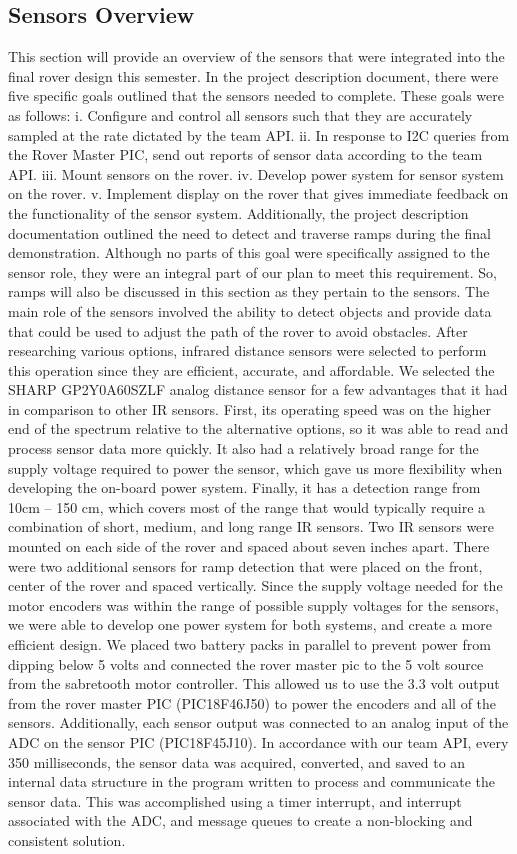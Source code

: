 \subsection{Sensors Overview}
This section will provide an overview of the sensors that were integrated into the final rover design this semester. In the project description document, there were five specific goals outlined that the sensors needed to complete. These goals were as follows: 
i. Configure and control all sensors such that they are accurately sampled at the rate dictated by the team API.
ii. In response to I2C queries from the Rover Master PIC, send out reports of sensor data according to the team API.
iii. Mount sensors on the rover.
iv. Develop power system for sensor system on the rover.
v. Implement display on the rover that gives immediate feedback on the functionality of the sensor system.
Additionally, the project description documentation outlined the need to detect and traverse ramps during the final demonstration. Although no parts of this goal were specifically assigned to the sensor role, they were an integral part of our plan to meet this requirement. So, ramps will also be discussed in this section as they pertain to the sensors.
The main role of the sensors involved the ability to detect objects and provide data that could be used to adjust the path of the rover to avoid obstacles. After researching various options, infrared distance sensors were selected to perform this operation since they are efficient, accurate, and affordable. We selected the SHARP GP2Y0A60SZLF analog distance sensor for a few advantages that it had in comparison to other IR sensors. First, its operating speed was on the higher end of the spectrum relative to the alternative options, so it was able to read and process sensor data more quickly. It also had a relatively broad range for the supply voltage required to power the sensor, which gave us more flexibility when developing the on-board power system. Finally, it has a detection range from 10cm – 150 cm, which covers most of the range that would typically require a combination of short, medium, and long range IR sensors. 
Two IR sensors were mounted on each side of the rover and spaced about seven inches apart. There were two additional sensors for ramp detection that were placed on the front, center of the rover and spaced vertically. Since the supply voltage needed for the motor encoders was within the range of possible supply voltages for the sensors, we were able to develop one power system for both systems, and create a more efficient design. We placed two battery packs in parallel to prevent power from dipping below 5 volts and connected the rover master pic to the 5 volt source from the sabretooth motor controller. This allowed us to use the 3.3 volt output from the rover master PIC (PIC18F46J50) to power the encoders and all of the sensors. Additionally, each sensor output was connected to an analog input of the ADC on the sensor PIC (PIC18F45J10). In accordance with our team API, every 350 milliseconds, the sensor data was acquired, converted, and saved to an internal data structure in the program written to process and communicate the sensor data. This was accomplished using a timer interrupt, and interrupt associated with the ADC, and message queues to create a non-blocking and consistent solution. 
